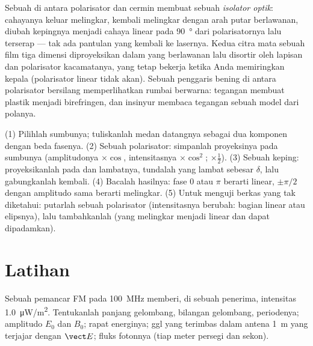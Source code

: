 \begin{example}\label{ex:b2:plane-waves-polarization:plateuses}
Sebuah  di antara polarisator dan cermin membuat sebuah
\emph{isolator optik}: cahayanya keluar melingkar, kembali
melingkar dengan arah putar berlawanan, diubah kepingnya menjadi cahaya
linear pada \qty{90}{\degree} dari polarisatornya lalu terserap --- tak ada
pantulan yang kembali ke lasernya. Kedua citra mata sebuah film tiga dimensi
diproyeksikan dalam  yang berlawanan lalu disortir oleh
lapisan  dan polarisator kacamatanya, yang tetap bekerja
ketika Anda memiringkan kepala (polarisator linear tidak akan). Sebuah penggaris
bening di antara polarisator bersilang memperlihatkan rumbai berwarna: tegangan membuat
plastik menjadi birefringen, dan insinyur membaca tegangan sebuah model dari
polanya.
\end{example}

\begin{method}\label{met:b2:plane-waves-polarization:method}
(1) Pilihlah sumbunya; tuliskanlah medan datangnya sebagai dua komponen dengan
beda fasenya. (2) Sebuah polarisator: simpanlah proyeksinya pada
sumbunya (amplitudonya $\times\cos$, intensitasnya $\times\cos^2$; 
$\times\tfrac12$). (3) Sebuah keping: proyeksikanlah pada  dan lambatnya, tundalah
yang lambat sebesar $\delta$, lalu gabungkanlah kembali. (4) Bacalah hasilnya: fase $0$ atau $\pi$
berarti linear, $\pm\pi/2$ dengan amplitudo sama berarti melingkar. (5) Untuk
menguji berkas yang tak diketahui: putarlah sebuah polarisator (intensitasnya berubah: bagian linear
atau elipsnya), lalu tambahkanlah  (yang melingkar menjadi
linear dan dapat dipadamkan).
\end{method}

\section{Latihan}

\begin{exercise}[$\star$]\label{exo:b2:plane-waves-polarization:1}
Sebuah pemancar FM pada \qty{100}{MHz} memberi, di sebuah penerima, intensitas
\qty{1.0}{\micro W/m^2}. Tentukanlah panjang gelombang, bilangan gelombang, periodenya; amplitudo $E_0$ dan
$B_0$; rapat energinya; ggl yang terimbas dalam antena \qty{1}{m} yang terjajar dengan
$\vect E$; fluks fotonnya (tiap meter persegi dan sekon).
\end{exercise}

